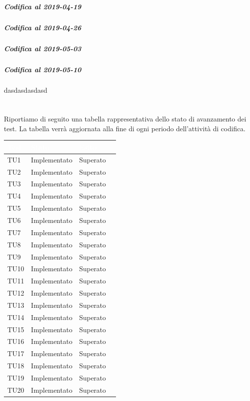 \subparagraph{Codifica al 2019-04-19}

\subparagraph{Codifica al 2019-04-26}

\subparagraph{Codifica al 2019-05-03}

\subparagraph{Codifica al 2019-05-10}
dasdasdasdasd\\
\\
\\Riportiamo di seguito una tabella rappresentativa dello stato di avanzamento dei test. La tabella verrà aggiornata alla fine di ogni periodo dell'attività di codifica.

\begin{longtable}{|>{\centering\arraybackslash}m{1.6cm}|>{\centering\arraybackslash}m{6.41cm}|>{\centering\arraybackslash}m{3.1cm}| c |}		
	\rowcolor{LightBlue}
	\textbf{\textcolor{white}{Test}}
	& \textbf{\textcolor{white}{Stato}}
	& \textbf{\textcolor{white}{Esito}}\\
	\hline
	TU1 & Implementato & Superato \\ \hline
	TU2 & Implementato & Superato  \\ \hline
	TU3 & Implementato & Superato  \\ \hline
	TU4 & Implementato & Superato  \\ \hline
	TU5 & Implementato & Superato  \\ \hline
	TU6 & Implementato & Superato  \\ \hline
	TU7 & Implementato & Superato  \\ \hline
	TU8 & Implementato & Superato  \\ \hline
	TU9 & Implementato & Superato  \\ \hline
	TU10 & Implementato & Superato  \\ \hline
	TU11 & Implementato & Superato  \\ \hline		
	TU12 & Implementato & Superato  \\ \hline
	TU13 & Implementato & Superato  \\ \hline
	TU14 & Implementato & Superato \\ \hline
	TU15 & Implementato & Superato  \\ \hline
	TU16 & Implementato & Superato \\ \hline
	TU17 & Implementato & Superato \\ \hline
	TU18 & Implementato & Superato \\ \hline
	TU19 & Implementato & Superato \\ \hline
	TU20 & Implementato & Superato \\ \hline

\end{longtable}

